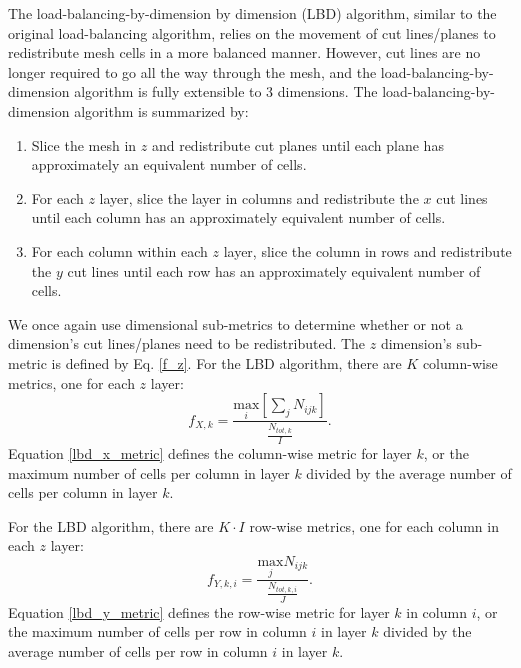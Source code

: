 The load-balancing-by-dimension by dimension (LBD) algorithm, similar to the original load-balancing algorithm, relies on the movement of cut lines/planes to redistribute mesh cells in a more balanced manner.
However, cut lines are no longer required to go all the way through the mesh, and the load-balancing-by-dimension algorithm is fully extensible to 3 dimensions. 
The load-balancing-by-dimension algorithm is summarized by:
\begin{enumerate}
  \item Slice the mesh in $z$ and redistribute cut planes until each plane has approximately an equivalent number of cells.
  \item For each $z$ layer, slice the layer in columns and redistribute the $x$ cut lines until each column has an approximately equivalent number of cells.
  \item For each column within each $z$ layer, slice the column in rows and redistribute the $y$ cut lines until each row has an approximately equivalent number of cells.
\end{enumerate}

We once again use dimensional sub-metrics to determine whether or not a dimension's cut lines/planes need to be redistributed. The $z$ dimension's sub-metric is defined by Eq. \ref{f_z}. For the LBD algorithm, there are $K$ column-wise metrics, one for each $z$ layer:
\begin{equation}
f_{X,k} = \frac{ \underset{i}{\text{max}}[ \sum_{j} N_{ijk}]  }  {\frac{N_{tot,k}}{I}}.
\label{lbd_x_metric}
\end{equation}
Equation \ref{lbd_x_metric} defines the column-wise metric for layer $k$, or the maximum number of cells per column in layer $k$ divided by the average number of cells per column in layer $k$. 

For the LBD algorithm, there are $K\cdot I$ row-wise metrics, one for each column in each $z$ layer:
\begin{equation}
f_{Y,k,i} = \frac{\underset{j}{\text{max}} N_{ijk} } {\frac{N_{tot,k,i}}{J}}.
\label{lbd_y_metric}
\end{equation}
Equation \ref{lbd_y_metric} defines the row-wise metric for layer $k$ in column $i$, or the maximum number of cells per row in column $i$ in layer $k$ divided by the average number of cells per row in column $i$ in layer $k$. 

